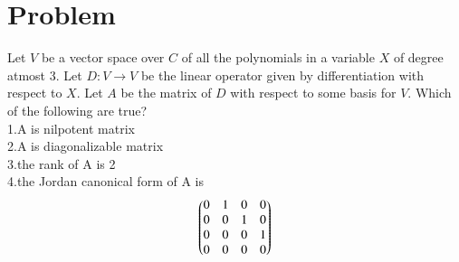 \documentclass[journal,12pt,twocolumn]{IEEEtran}
\begin{document}
\section{\textbf{Problem}}
Let $V$ be a vector space over $C$ of all the polynomials in a variable $X$ of degree atmost 3. Let $D:V \xrightarrow{} V$ be the linear operator given by differentiation with respect to $X$. Let $A$ be the matrix of $D$ with respect to some basis for $V$. Which of the following are true? \\
1.A is nilpotent matrix \\
2.A is diagonalizable matrix \\ 
3.the rank of A is 2 \\
4.the Jordan canonical form of A is
\begin{align}\nonumber
    \begin{pmatrix}0&1&0&0\\
       0&0&1&0\\
       0&0&0&1\\
       0&0&0&0\end{pmatrix}
\end{align}
\end{document}
